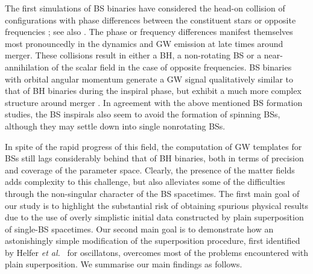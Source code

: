 The first simulations of BS binaries have considered the
head-on collision of configurations with phase differences
between the constituent stars or opposite frequencies
\cite{Palenzuela:2006wp}; see also
\cite{Choptuik:2009ww,Bezares:2017mzk}.
The phase or frequency differences manifest themselves most
pronouncedly in the dynamics and GW emission at late times
around merger. These collisions result in either
a BH, a non-rotating BS or a near-annihilation of the scalar
field in the case of opposite frequencies. BS binaries
with orbital angular momentum generate a GW signal
qualitatively similar to that of BH binaries during the
inspiral phase, but exhibit a much more complex structure around
merger \cite{Palenzuela:2007dm,Palenzuela:2017kcg}.
In agreement with the above mentioned BS formation 
studies, the BS inspirals also seem to avoid the formation
of spinning BSs, although they may settle down into
single nonrotating BSs.

In spite of the
rapid progress of this field, the computation of GW templates
for BSs still lags considerably behind that of BH binaries,
both in terms of precision and coverage of the parameter space.
Clearly, the presence of the matter fields adds complexity to
this challenge, but also alleviates some of the difficulties
through
the non-singular character of the BS spacetimes. The first main goal
of our study is to highlight the substantial risk of obtaining
spurious physical results due to the use of overly simplistic
initial data constructed by plain superposition of single-BS
spacetimes. Our second main goal is to demonstrate
how an astonishingly
simple modification of the superposition procedure,
first identified by Helfer
{\it et al.}~\cite{Helfer:2018vtq} for oscillatons,
overcomes most of the problems encountered with plain
superposition. We summarise our main findings as follows.



